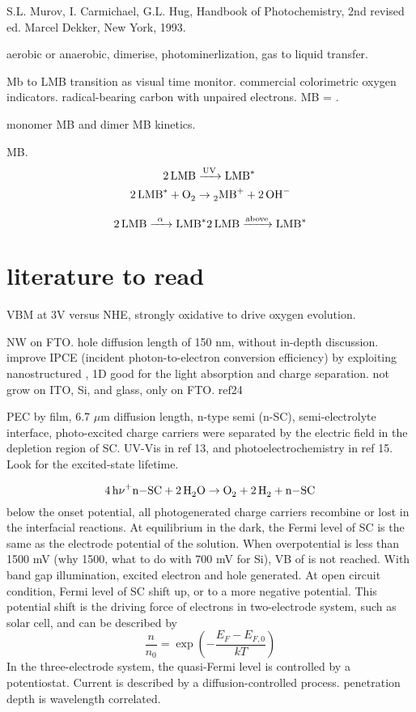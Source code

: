 

S.L. Murov, I. Carmichael, G.L. Hug, Handbook of Photochemistry, 2nd revised ed. Marcel Dekker, New York, 1993.

aerobic or anaerobic, dimerise, photominerlization, gas to liquid transfer.

Mb to LMB transition as visual time monitor. commercial colorimetric oxygen indicators. radical-bearing carbon with unpaired electrons. MB = .\cite{Galagan2008}

monomer MB and dimer MB kinetics.\cite{Spencer1979}



MB. \cite{Lee2003a}
\begin{align}
\cee{ 2LMB &->[\text{UV}] LMB^*\\
2LMB^* + O2 &\rightarrow 2MB^+ + 2OH^-}
\end{align}

\[
\cee{2LMB ->[\alpha] LMB^*}
\cee{2LMB ->[\text{above}] LMB^*}
\]


\section{literature to read}

 \cite{Zhang2015}
VBM at 3V versus NHE, strongly oxidative to drive oxygen evolution. 


 NW on FTO.\cite{Kalanur2013} hole diffusion length of 150 nm, without in-depth discussion.  improve IPCE (incident photon-to-electron conversion efficiency) by exploiting nanostructured , 1D good for the light absorption and charge separation. not grow on ITO, Si, and glass, only on FTO. ref24 

PEC by  film, 6.7 $\mu$m diffusion length, n-type semi (n-SC), semi-electrolyte interface, photo-excited charge carriers were separated by the electric field in the depletion region of SC.\cite{Wang2000} UV-Vis in ref 13, and photoelectrochemistry in ref 15. Look for the excited-state lifetime. 

\[
\cee{4h\nu + n-SC + 2H2O \rightarrow O2 + 2H2 + n-SC}
\]
below the onset potential, all photogenerated charge carriers recombine or lost in the interfacial reactions. At equilibrium in the dark, the Fermi level of SC is the same as the electrode potential of the solution. When overpotential is less than 1500 mV (why 1500, what to do with 700 mV for Si), VB of  is not reached. With band gap illumination, excited electron and hole generated. At open circuit condition, Fermi level of SC shift up, or to a more negative potential. This potential shift is the driving force of electrons in two-electrode system, such as solar cell, and can be described by 
\[
\frac{n}{n_0} = \exp(-\frac{E_F - E_{F,0}}{kT})
\]
In the three-electrode system, the quasi-Fermi level is controlled by a potentiostat. Current is described by a diffusion-controlled process. penetration depth is wavelength correlated. 

